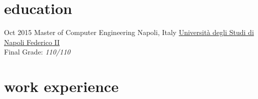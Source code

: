\vspace{-0.3cm}
\section{\normalfont education}

\begin{entrylist}
\entry
{Oct 2015}
{Master {\normalfont of Computer Engineering}}
{Napoli, Italy}
{\href{http://www.unina.it/home}{Università degli Studi di Napoli Federico II}}\\
Final Grade: \emph{110/110}


\end{entrylist}

\section{\normalfont work experience}

